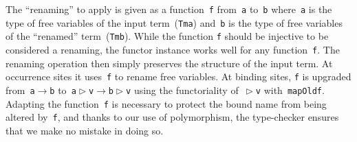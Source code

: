 \documentclass[9pt,authoryear]{sigplanconf}
\begin{document}
%
The {``}renaming{''} to apply is given as a function{~}\texttt{f} from{~}\texttt{a}    to{~}\texttt{b} where{~}\texttt{a} is the type of free variables of the input
    term{~}(\texttt{Tm}\texttt{\mbox{\hspace{0.50em}}}\texttt{a}) and{~}\texttt{b} is the type of free variables of the
    {``}renamed{''} term{~}(\texttt{Tm}\texttt{\mbox{\hspace{0.50em}}}\texttt{b}). While the function \texttt{f} should be injective
    to be considered a renaming, the functor instance
    works well for any function{~}\texttt{f}. The renaming operation then
    simply preserves the structure of the input term. At occurrence
    sites it uses{~}\texttt{f} to rename free variables. At binding sites,
    \texttt{f} is upgraded from{~}\texttt{\makebox[1.22ex][l]{$ {(} $}}\texttt{a}\texttt{\mbox{\hspace{0.50em}}}\texttt{$ \rightarrow $}\texttt{\mbox{\hspace{0.50em}}}\texttt{b}\texttt{\makebox[1.22ex][r]{$ {)} $}} to{~}\texttt{\makebox[1.22ex][l]{$ {(} $}}\texttt{a}\texttt{\mbox{\hspace{0.50em}}}\texttt{$ \vartriangleright $}\texttt{\mbox{\hspace{0.50em}}}\texttt{v}\texttt{\mbox{\hspace{0.50em}}}\texttt{$ \rightarrow $}\texttt{\mbox{\hspace{0.50em}}}\texttt{b}\texttt{\mbox{\hspace{0.50em}}}\texttt{$ \vartriangleright $}\texttt{\mbox{\hspace{0.50em}}}\texttt{v}\texttt{\makebox[1.22ex][r]{$ {)} $}} using
    the functoriality of{~}\texttt{\makebox[1.22ex][l]{$ {(} $}}\texttt{$ \vartriangleright $}\texttt{\mbox{\hspace{0.50em}}}\texttt{v}\texttt{\makebox[1.22ex][r]{$ {)} $}} with{~}\texttt{mapOld}\texttt{\mbox{\hspace{0.50em}}}\texttt{f}. Adapting the
    function{~}\texttt{f} is necessary to protect the bound name from being
    altered by{~}\texttt{f}, and thanks to our use of polymorphism, the
    type-checker ensures that we make no mistake in doing so.%


{\nopagebreak }
\end{document}
